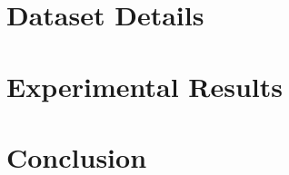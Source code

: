 \documentclass[twocolumn, 10pt]{article}
\begin{document}
\section{Dataset Details}

\section{Experimental Results}

\section{Conclusion}



\end{document}
